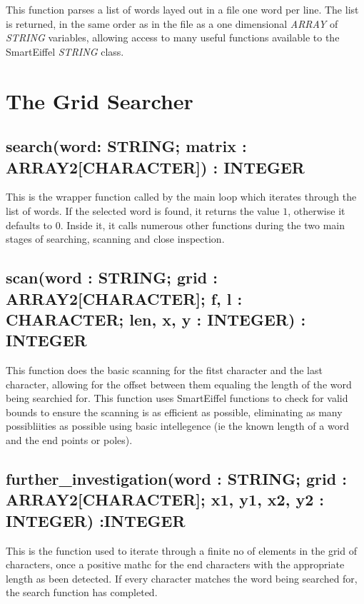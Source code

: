 \documentclass[a4paper,12pt]{article}
\begin{document}
\noindent This function parses a list of words layed out in a file one
word per line. The list is returned, in the same order as in the file as
a one dimensional \emph{ARRAY} of \emph{STRING} variables, allowing
access to many useful functions available to the SmartEiffel
\emph{STRING} class.

\section{The Grid Searcher}

\subsection{search(word: STRING; matrix : ARRAY2[CHARACTER]) : INTEGER}

\noindent This is the wrapper function called by the main loop which
iterates through the list of words. If the selected word is found, it
returns the value $1$, otherwise it defaults to $0$. Inside it, it calls
numerous other functions during the two main stages of searching,
scanning and close inspection.

\subsection{scan(word : STRING; grid : ARRAY2[CHARACTER]; f, l :
CHARACTER; len, x, y : INTEGER) : INTEGER}


\noindent This function does the basic scanning for the fitst character
and the last character, allowing for the offset between them equaling
the length of the word being searchied for. This function uses
SmartEiffel functions to check for valid bounds to ensure the scanning
is as efficient as possible, eliminating as many possibliities as
possible using basic intellegence (ie the known length of a word and the
end points or poles).

\subsection{further\_investigation(word : STRING; grid :
ARRAY2[CHARACTER]; x1, y1, x2, y2 : INTEGER) :INTEGER}

\noindent This is the function used to iterate through a finite no of
elements in the grid of characters, once a positive mathc for the end
characters with the appropriate length as been detected. If every
character matches the word being searched for, the search function has
completed.
\end{document}
